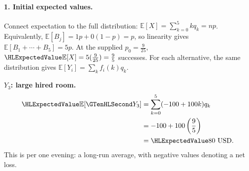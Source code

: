 \paragraph{1. Initial expected values.}
Connect expectation to the full distribution: $\mathbb E[X]=\sum_{k=0}^5kq_k=np$.
Equivalently, $\mathbb E[B_j]=1p+0(1-p)=p$, so linearity gives
$\mathbb E[B_1+\cdots+B_5]=5p$.
At the supplied $p_0=\frac{9}{25}$, $\ExpectedValue{\mathbb E[X]}=5(\frac{9}{25})=\frac{9}{5}$ successes.
For each alternative, the same distribution gives $\mathbb E[Y_i]=\sum_k f_i(k)q_k$.
\par\noindent\begin{minipage}[t]{.48\linewidth}\vspace{0pt}
\textbf{$Y_3$: large hired room.}
\[
\begin{aligned}
\ExpectedValue{\mathbb E}[\Money{Y_3}]&=\sum_{k=0}^5(-100+100k)q_k\\
&=-100+100\left(\frac{9}{5}\right)\\
&=\ExpectedValue{80\ \text{USD}}.
\end{aligned}
\]
This is  per one evening: a long-run average, with negative values denoting a net loss.
\end{minipage}\par
